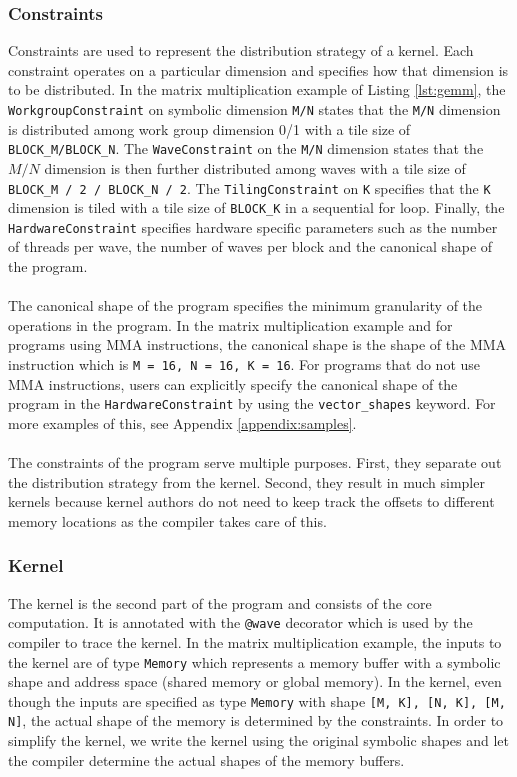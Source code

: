 \documentclass{article}
\begin{document}
\subsubsection{Constraints}
Constraints are used to represent the distribution strategy of a kernel. Each constraint operates on a particular
dimension and specifies how that dimension is to be distributed. In the matrix multiplication example of Listing \ref{lst:gemm},
the \texttt{WorkgroupConstraint} on symbolic dimension \texttt{M/N} states that the \texttt{M/N} dimension is distributed among work group dimension 0/1
with a tile size of \texttt{BLOCK\_M/BLOCK\_N}. The \texttt{WaveConstraint} on the \texttt{M/N} dimension states that the $M/N$ dimension is then further distributed among waves
with a tile size of \texttt{BLOCK\_M / 2 / BLOCK\_N / 2}. The \texttt{TilingConstraint} on \texttt{K} specifies that the \texttt{K} dimension is tiled with a tile size of \texttt{BLOCK\_K}
in a sequential for loop. Finally, the \texttt{HardwareConstraint} specifies hardware specific parameters such as the number of threads per wave, the number of waves per block and
the canonical shape of the program.
\\ \\
The canonical shape of the program specifies the minimum granularity of the operations in the program. In the matrix multiplication example and for programs using MMA instructions, the canonical shape is
the shape of the MMA instruction which is \texttt{M = 16, N = 16, K = 16}. For programs that do not use MMA instructions, users can
explicitly specify the canonical shape of the program in the \texttt{HardwareConstraint} by using the \texttt{vector\_shapes} keyword. For more examples of this,
see Appendix \ref{appendix:samples}.
\\ \\
The constraints of the program serve multiple purposes. First, they separate out the distribution strategy from the kernel.
Second, they result in much simpler kernels because kernel authors do not need to keep track the offsets to different memory locations
as the compiler takes care of this.

\subsubsection{Kernel}
The kernel is the second part of the program and consists of the core computation. It is annotated with the \texttt{@wave} decorator which
is used by the compiler to trace the kernel. In the matrix multiplication example, the inputs to the kernel are of type \texttt{Memory} which
represents a memory buffer with a symbolic shape and address space (shared memory or global memory). In the kernel,
even though the inputs are specified as type \texttt{Memory} with shape \texttt{[M, K], [N, K], [M, N]}, the actual shape of the memory
is determined by the constraints. In order to simplify the kernel, we write the kernel using the original symbolic shapes and let the compiler
determine the actual shapes of the memory buffers.
\end{document}
